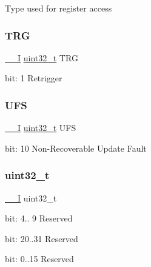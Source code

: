 Type used for register access \mbox{\label{union_t_c_c___i_n_t_f_l_a_g___type_a28944e122323901490bf08837e16f7c7}} 
\subsubsection{\texorpdfstring{TRG}{TRG}}
{\footnotesize\ttfamily \mbox{\hyperlink{core__cm0plus_8h_af63697ed9952cc71e1225efe205f6cd3}{\+\_\+\+\_\+I}} \mbox{\hyperlink{union_t_c_c___i_n_t_f_l_a_g___type_a7c2ec0f7b3f1314bdede58b182af397c}{uint32\+\_\+t}} T\+RG}

bit\+: 1 Retrigger \mbox{\label{union_t_c_c___i_n_t_f_l_a_g___type_a8834d9814b29e352a1eef8c6350ba159}} 
\subsubsection{\texorpdfstring{UFS}{UFS}}
{\footnotesize\ttfamily \mbox{\hyperlink{core__cm0plus_8h_af63697ed9952cc71e1225efe205f6cd3}{\+\_\+\+\_\+I}} \mbox{\hyperlink{union_t_c_c___i_n_t_f_l_a_g___type_a7c2ec0f7b3f1314bdede58b182af397c}{uint32\+\_\+t}} U\+FS}

bit\+: 10 Non-\/\+Recoverable Update Fault \mbox{\label{union_t_c_c___i_n_t_f_l_a_g___type_a7c2ec0f7b3f1314bdede58b182af397c}} 
\subsubsection{\texorpdfstring{uint32\_t}{uint32\_t}}
{\footnotesize\ttfamily \mbox{\hyperlink{core__cm0plus_8h_af63697ed9952cc71e1225efe205f6cd3}{\+\_\+\+\_\+I}} uint32\+\_\+t}

bit\+: 4.. 9 Reserved

bit\+: 20..31 Reserved

bit\+: 0..15 Reserved \mbox{\label{union_t_c_c___i_n_t_f_l_a_g___type_ace4f5b012f51a434f288481d81645394}} 
